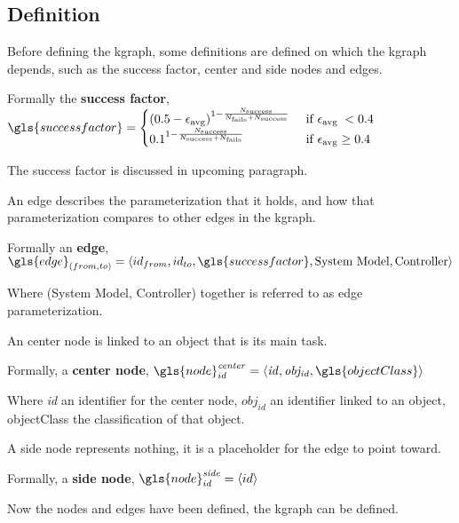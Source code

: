 \subsection{Definition}%
\label{subsec:kgraph_definition}
Before defining the \ac{kgraph}, some definitions are defined on which the \ac{kgraph} depends, such as the success factor, center and side nodes and edges.\bs

Formally the \textbf{success factor}, $\gls{successfactor} = \begin{cases} \left(0.5-\epsilon_{\textrm {avg}}\right)^{1-\frac{N_\textrm{success}}{N_\textrm{fails}+ N_\textrm{success}}} & \textrm { if } \epsilon_{\textrm {avg }}<0.4 \\ 0.1^{1-\frac{N_\textrm{success}}{N_\textrm{success}+N_\textrm{fails}}} & \textrm{ if } \epsilon_{\textrm{avg}} \geq 0.4 \end{cases}$\bs

\noindent The success factor is discussed in upcoming paragraph.\bs

\noindent An edge describes the parameterization that it holds, and how that parameterization compares to other edges in the \ac{kgraph}.\bs

Formally an \textbf{edge}, $\gls{edge}_{(from, to)} = \left\langle id_{from}, id_{to}, \gls{successfactor}, \textrm{System Model}, \textrm{Controller}\right\rangle$\bs

\noindent Where (System Model, Controller) together is referred to as edge parameterization.\bs

\noindent An center node is linked to an object that is its main task.\bs

Formally, a \textbf{center node}, $\gls{node}^{\mathit{center}}_{id} =\left\langle \mathit{id}, \mathit{obj_{id}}, \gls{objectClass} \right\rangle $\bs

Where \textit{id} an identifier for the center node, $\mathit{obj_{id}}$ an identifier linked to an object, \gls{objectClass} the classification of that object.\bs

\noindent A side node represents nothing, it is a placeholder for the edge to point toward.\bs

Formally, a \textbf{side node}, $\gls{node}^{\mathit{side}}_{id} =\left\langle id \right\rangle $\bs

\noindent Now the nodes and edges have been defined, the \ac{kgraph} can be defined.\bs

